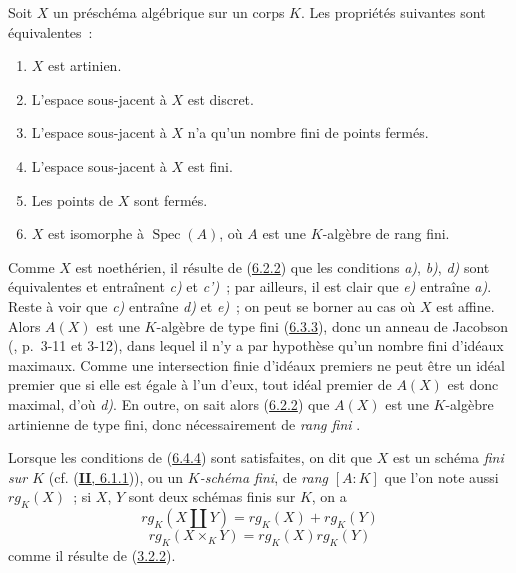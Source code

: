 \begin{proposition}[6.4.4]
\label{I.6.4.4-fr}
Soit $X$ un préschéma algébrique sur un corps $K$. Les propriétés suivantes
sont équivalentes~:
\begin{enumerate}
  \item[\textup{a)}] $X$ est artinien.
  \item[\textup{b)}] L'espace sous-jacent à $X$ est discret.
  \item[\textup{c)}] L'espace sous-jacent à $X$ n'a qu'un nombre fini de points
    fermés.
  \item[\textup{c')}] L'espace sous-jacent à $X$ est fini.
  \item[\textup{d)}] Les points de $X$ sont fermés.
  \item[\textup{e)}] $X$ est isomorphe à $\operatorname{Spec}(A)$, où $A$ est une
    $K$-algèbre de rang fini.
\end{enumerate}
\end{proposition}

Comme $X$ est noethérien, il résulte de (\hyperref[I.6.2.2-fr]{6.2.2}) que
les conditions \emph{a)}, \emph{b)}, \emph{d)} sont équivalentes et entraînent \emph{c)} et \emph{c')}~; par
ailleurs, il est clair que \emph{e)} entraîne \emph{a)}. Reste à voir que \emph{c)} entraîne \emph{d)} et
\emph{e)}~; on peut se borner au cas où $X$ est affine. Alors $A(X)$ est une
$K$-algèbre de type fini (\hyperref[I.6.3.3-fr]{6.3.3}), donc un anneau de
Jacobson (\cite{I-1}, p.~3-11 et 3-12), dans lequel il n'y a par hypothèse
qu'un nombre fini d'idéaux maximaux. Comme une intersection finie d'idéaux
premiers ne peut être un idéal premier que si elle est égale à l'un d'eux,
tout idéal premier de $A(X)$ est donc maximal, d'où \emph{d)}. En outre, on sait
alors (\hyperref[I.6.2.2-fr]{6.2.2}) que $A(X)$ est une $K$-algèbre
artinienne de type fini, donc nécessairement de \emph{rang fini} \cite{I-21}.

\begin{env}[6.4.5]
\label{I.6.4.5-fr}
Lorsque les conditions de (\hyperref[I.6.4.4-fr]{6.4.4}) sont satisfaites,
on dit que $X$ est un schéma \emph{fini sur $K$}
(cf. (\hyperref[II.6.1.1-fr]{\textbf{II}, 6.1.1})), ou un
\emph{$K$-schéma fini}, de \emph{rang} $[A:K]$ que l'on note aussi
$\mathit{rg}_K(X)$~; si $X$, $Y$ sont deux schémas finis sur $K$, on a
\[
  \mathit{rg}_K(X\amalg Y)
  =\mathit{rg}_K(X)+\mathit{rg}_K(Y)
  \tag{6.4.5.1}\label{I.6.4.5.1-fr}
\]
\[
  \mathit{rg}_K(X\times_K Y)
  =\mathit{rg}_K(X)\mathit{rg}_K(Y)
  \tag{6.4.5.2}\label{I.6.4.5.2-fr}
\]
comme il résulte de (\hyperref[I.3.2.2-fr]{3.2.2}).
\end{env}

